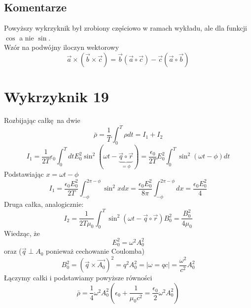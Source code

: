 \documentclass[a4paper,12pt]{article}
\begin{document}
\subsection{Komentarze}
	Powyższy wykrzyknik był zrobiony częściowo w ramach wykładu, ale dla funkcji $\cos$ a nie $\sin$.\\
	Wzór na podwójny iloczyn wektorowy
	$$
	\vec{a}\times(\vec{b}\times\vec{c}) = \vec{b}(\vec{a}\circ\vec{c}) - \vec{c}(\vec{a}\circ\vec{b})
	$$

\section{Wykrzyknik 19}
Rozbijając całkę na dwie
\begin{equation*}
  \bar{\rho} = \frac{1}{T} \int_0^T \rho dt = I_1 + I_2
\end{equation*}
\begin{equation*}
  I_1 = \frac{1}{2T}\epsilon_0 \int_0^T dt E_0^2 \sin^2 (\omega t -
  \underbrace{\vec{q} \circ \vec{r}}_{=\phi}) = \frac{\epsilon_0}{2T} E_0^2
  \int_0^T \sin^2 (\omega t - \phi) dt
\end{equation*}
Podstawiając $x = \omega t - \phi$
\begin{equation*}
  I_1 = \frac{\epsilon_0 E_0^2}{2T} \int_{-\phi}^{2\pi - \phi} \sin^2xdx =
  \frac{\epsilon_0 E_0^2}{8\pi} \int_{-\phi}^{2\pi-\phi} dx =
  \frac{\epsilon_0 E_0^2}{4}
\end{equation*}
Druga całka, analogicznie:
\begin{equation*}
  I_2 = \frac{1}{2T\mu_0} \int^T_0 \sin^2 (\omega t - \vec{q} \circ \vec{r}) B_0^2 =
  \frac{B_0^2}{4 \mu_0}
\end{equation*}
Wiedząc, że
\begin{equation*}
  E_0^2 = \omega^2 A_0^2
\end{equation*}
oraz ($\vec{q} \perp A_0$ ponieważ cechowanie Coulomba)
\begin{equation*}
  B_0^2 = \left( \vec{q} \times \vec{A_0} \right)^2 = q^2 A_0^2 = \bigg \vert
  \omega = qc \bigg \vert = \frac{\omega^2}{c^2}A_0^2
\end{equation*}
Łączymy całki i podstawiamy powyższe równości
\begin{equation*}
  \bar{\rho} = \frac{1}{4}\omega^2 A_0^2 \left(\epsilon_0 + \frac{1}{\mu_0 c^2}
    = \frac{\epsilon_0}{2} \omega^2 A_0^2\right) 
\end{equation*}
\end{document}
